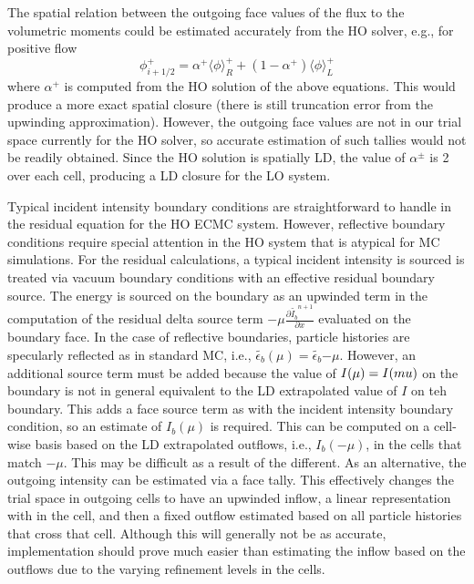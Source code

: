 \documentclass{mc2013}
\newcommand{\pderiv}[2]{\frac{\partial #1}{\partial #2}}
\newcommand{\mom}[1]{\langle #1 \rangle}
\begin{document}
The spatial relation between the outgoing face values of the flux to the volumetric
moments could be estimated accurately from the HO solver, e.g., for positive flow
\begin{equation}
\phi^+_{i+1/2} = \alpha^+ \mom{\phi}_R^+ + (1-\alpha^+) \mom{\phi}_L^+ 
\end{equation}
where $\alpha^+$ is computed from the HO solution of the above equations.  This
would produce a more exact spatial closure (there is still truncation error from the upwinding
approximation).  However, the outgoing face values are not in our trial space currently for the HO solver, so
accurate estimation of such tallies would not be readily obtained.  Since the
HO solution is spatially LD, the value of $\alpha^\pm$ is 2 over each cell, producing a LD closure for the LO
system. 

\label{alt}



Typical incident intensity boundary conditions are straightforward to handle in the
residual equation for the HO ECMC system. However, reflective boundary conditions require special attention
in the HO system that is atypical for MC simulations.  For the residual calculations, 
a typical incident intensity is sourced is treated via vacuum boundary conditions with an effective
residual boundary source.  The energy is sourced on the boundary as an upwinded term in the computation of
the residual delta source term $-\mu \pderiv{\tilde{I_b}^{n+1}}{x}$ evaluated on the
boundary face.
In the case of reflective boundaries, particle histories are specularly reflected as
in standard MC, i.e., $\tilde{\epsilon_b}(\mu) = \tilde{\epsilon_b}{-\mu}$.  However,
an additional source term must be added because the value of $I(\mu)=I(\-mu)$ on the
boundary is not in general equivalent to the LD extrapolated value of $I$ on teh
boundary. This adds a face source term as with the incident intensity boundary
condition, so an
estimate of $I_b(\mu)$ is required.  This can be computed on a cell-wise basis based
on the LD extrapolated outflows, i.e., $I_b(-\mu)$, in the cells that match $-\mu$.
This may be difficult as a result of the different.  As an alternative, the outgoing
intensity can be estimated via a face tally.  This effectively changes the trial
space in outgoing cells to have an upwinded inflow, a linear representation with in
the cell, and then a fixed outflow estimated based on all particle histories that
cross that cell.  Although this will generally not be as accurate, implementation
should prove much easier than estimating the inflow based on the outflows due to the
varying refinement levels in the cells.
\end{document}
